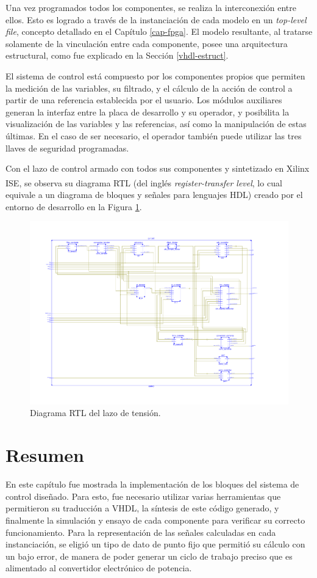 Una vez programados todos los componentes, se realiza la interconexión entre ellos. Esto es logrado a través de la instanciación de cada modelo en un \emph{top-level file}, concepto detallado en el Capítulo \ref{cap-fpga}. El modelo resultante, al tratarse solamente de la vinculación entre cada componente, posee una arquitectura estructural, como fue explicado en la Sección \ref{vhdl-estruct}.

El sistema de control está compuesto por los componentes propios que permiten la medición de las variables, su filtrado, y el cálculo de la acción de control a partir de una referencia establecida por el usuario. Los módulos auxiliares generan la interfaz entre la placa de desarrollo y su operador, y posibilita la visualización de las variables y las referencias, así como la manipulación de estas últimas. En el caso de ser necesario, el operador también puede utilizar las tres llaves de seguridad programadas.

Con el lazo de control armado con todos sus componentes y sintetizado en Xilinx ISE\textsuperscript\textregistered\hspace{0.05pt}, se observa su diagrama RTL (del inglés \emph{register-transfer level}, lo cual equivale a un diagrama de bloques y señales para lenguajes HDL) creado por el entorno de desarrollo en la Figura \ref{rtl-lazo}.

\begin{figure}[hbt!]
    \centering
    \includegraphics[width=0.65\columnwidth]{Imágenes/Diagrama RTL del lazo de tensión.pdf}    
    \caption{Diagrama RTL del lazo de tensión.}
    \label{rtl-lazo}
\end{figure} 

\section{Resumen}

En este capítulo fue mostrada la implementación de los bloques del sistema de control diseñado. Para esto, fue necesario utilizar varias herramientas que permitieron su traducción a VHDL, la síntesis de este código generado, y finalmente la simulación y ensayo de cada componente para verificar su correcto funcionamiento. Para la representación de las señales calculadas en cada instanciación, se eligió un tipo de dato de punto fijo que permitió su cálculo con un bajo error, de manera de poder generar un ciclo de trabajo preciso que es alimentado al convertidor electrónico de potencia. 

\newpage